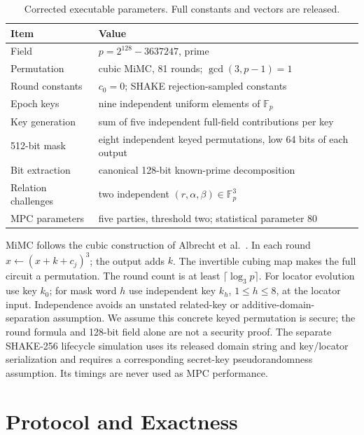 \documentclass[journal]{IEEEtran}
\begin{document}
\begin{table}[t]
\caption{Corrected executable parameters. Full constants and vectors are released.}
\label{tab:parameters}\centering\small
\begin{tabularx}{\columnwidth}{p{}X}
\toprule Item & Value \\
\midrule Field & $p=2^{128}-3637247$, prime \\
Permutation & cubic MiMC, 81 rounds; $\gcd(3,p-1)=1$ \\
Round constants & $c_0=0$; SHAKE rejection-sampled constants \\
Epoch keys & nine independent uniform elements of $\mathbb F_p$ \\
Key generation & sum of five independent full-field contributions per key \\
512-bit mask & eight independent keyed permutations, low 64 bits of each output \\
Bit extraction & canonical 128-bit known-prime decomposition \\
Relation challenges & two independent $(r,\alpha,\beta)\in\mathbb F_p^3$ \\
MPC parameters & five parties, threshold two; statistical parameter 80 \\
\bottomrule
\end{tabularx}
\end{table}

MiMC follows the cubic construction of Albrecht et al.~\cite{albrecht2016mimc}. In each round $x\leftarrow(x+k+c_j)^3$; the output adds $k$. The invertible cubing map makes the full circuit a permutation. The round count is at least $\lceil\log_3 p\rceil$. For locator evolution use key $k_0$; for mask word $h$ use independent key $k_h$, $1\le h\le8$, at the locator input. Independence avoids an unstated related-key or additive-domain-separation assumption. We assume this concrete keyed permutation is secure; the round formula and 128-bit field alone are not a security proof. The separate SHAKE-256 lifecycle simulation uses its released domain string and key/locator serialization and requires a corresponding secret-key pseudorandomness assumption. Its timings are never used as MPC performance.

\section{Protocol and Exactness}
\end{document}
